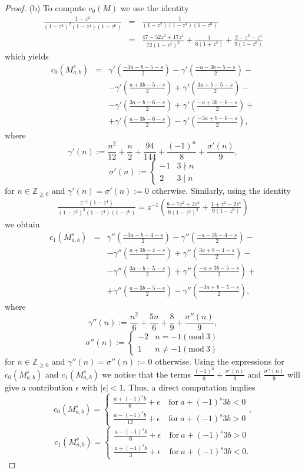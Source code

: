 \documentclass[12pt]{amsart}
\theoremstyle{plain} %
\newcommand {\ZZ} {\mathbb {Z}}
\newcommand{\eps}{\epsilon}
\renewcommand{\mod}{\mathrm{mod~}}
\newcommand{\doublebrace}[4]{\left\{\begin{array}{ll}#1 & #2 \\ #3 & #4\end{array}\right.}
\newcommand {\eqdef} {:=}
\begin{document}
\begin{proof}
(b) To compute $c_0(M)$ we use the identity
\begin{eqnarray*}
\frac{1-z^2}{(1-z^2)^2(1-z^4)(1-z^6)}&=&\frac{1}{(1-z^2)(1-z^4)(1-z^6)}\\
&=&\frac{47-52z^2+17z^4}{72(1-z^2)^3}+\frac{1}{8(1+z^2)}+\frac{2-z^2-z^4}{9(1-z^6)}
\end{eqnarray*}
which yields
\begin{eqnarray*}
c_0(M_{a,b}^s)&=&\gamma'\left( \frac{-3a-b-5-s}{2}\right)-\gamma'\left( \frac{-a-3b-5-s}{2}\right)-\\
&&-\gamma'\left( \frac{a+3b-5-s}{2}\right)+\gamma'\left( \frac{3a+b-5-s}{2}\right)-\\
&&-\gamma'\left( \frac{3a-b-6-s}{2}\right)+\gamma'\left( \frac{-a+3b-6-s}{2}\right)+\\
&&+\gamma'\left( \frac{a-3b-6-s}{2}\right)-\gamma'\left( \frac{-3a+b-6-s}{2}\right),
\end{eqnarray*}
where
\[
\gamma'(n)\eqdef
\frac{n^2}{12}+\frac{n}{2}+\frac{94}{144}+\frac{(-1)^n}{8}+\frac{\sigma'(n)}{9},
\]
\[
\sigma'(n)\eqdef\doublebrace{-1}{3\nmid n}{2}{3\mid n}
\]
for $n\in \ZZ_{\geq 0}$ and $\gamma'(n)=\sigma'(n):=0$ otherwise. Similarly, using the identity
\begin{eqnarray*}
\frac{z^{-1}(1-z^4)}{(1-z^2)^2(1-z^4)(1-z^6)}=z^{-1}\left( \frac{8-7z^2+2z^4}{9(1-z^2)^3}+\frac{1+z^2-2z^4}{9(1-z^6)}\right)
\end{eqnarray*}
we obtain
\begin{eqnarray*}
c_1(M_{a,b}^s)&=&\gamma''\left( \frac{-3a-b-4-s}{2}\right)-\gamma''\left( \frac{-a-3b-4-s}{2}\right)-\\
&&-\gamma''\left( \frac{a+3b-4-s}{2}\right)+\gamma''\left( \frac{3a+b-4-s}{2}\right)-\\
&&-\gamma''\left( \frac{3a-b-5-s}{2}\right)+\gamma''\left( \frac{-a+3b-5-s}{2}\right)+\\
&&+\gamma''\left( \frac{a-3b-5-s}{2}\right)-\gamma''\left( \frac{-3a+b-5-s}{2}\right),
\end{eqnarray*}
where
\[
\gamma''(n)\eqdef \frac{n^2}{6}+\frac{5n}{6}+\frac{8}{9}+\frac{\sigma''(n)}{9},
\]
\[
\sigma''(n)\eqdef\doublebrace{-2}{n= -1 (\mod 3)}{1}{n\neq -1 (\mod 3)}
\]
for $n\in \ZZ_{\geq 0}$ and $\gamma''(n)=\sigma''(n):=0$ otherwise. Using the expressions for $c_0(M^s_{a,b})$ and $c_1(M^s_{a,b})$ we notice that the terms $\frac{(-1)^n}{8}+\frac{\sigma'(n)}{9}$ and $\frac{\sigma''(n)}{9}$ will give a contribution $\eps$ with $|\eps|<1$. Thus, a direct computation implies
\[
c_0(M^s_{a,b})=\doublebrace{\frac{a+(-1)^sb}{6}+\eps}{\mathrm{~for~}a+(-1)^s3b<0}{\frac{a-(-1)^sb}{12}+\eps}{\mathrm{~for~}a+(-1)^s3b>0},
\]
\[
c_1(M^s_{a,b})=\doublebrace{\frac{a-(-1)^sb}{6}+\eps}{\mathrm{~for~}a+(-1)^s3b>0}{\frac{a+(-1)^sb}{3}+\eps}{\mathrm{~for~}a+(-1)^s3b<0.}
\]
\end{proof}
\end{document}
